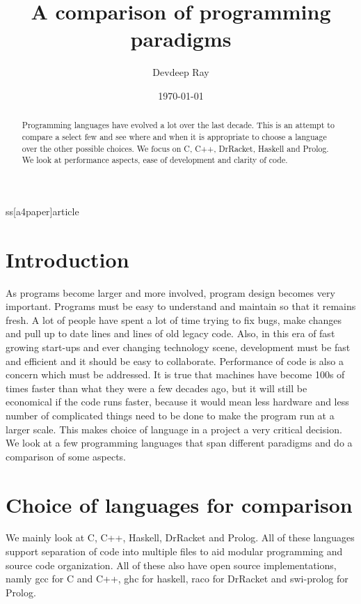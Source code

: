 ss[a4paper]{article}
\usepackage[a4paper, total={7in, 10in}]{geometry}
\usepackage[english]{babel}
\usepackage[utf8]{inputenc}
\usepackage{amsmath}
\usepackage{graphicx}
\usepackage{listings}

\title{A comparison of programming paradigms}

\author{Devdeep Ray}

\date{\today}


\maketitle

\begin{abstract}
Programming languages have evolved a lot over the last decade. This is an attempt 
to compare a select few and see where and when it is appropriate to choose a
language over the other possible choices. We focus on C, C++, DrRacket, Haskell 
and Prolog. We look at performance aspects, ease of development and clarity of 
code.
\end{abstract}

\section{Introduction}
As programs become larger and more involved, program design becomes very important.
Programs must be easy to understand and maintain so that it remains fresh. A lot of
people have spent a lot of time trying to fix bugs, make changes and pull up to
date lines and lines of old legacy code. Also, in this era of fast growing start-ups
and ever changing technology scene, development must be fast and efficient and it
should be easy to collaborate. Performance of code is also a concern which must be 
addressed. It is true that machines have become 100s of times faster than what they 
were a few decades ago, but it will still be economical if the code runs faster, 
because it would mean less hardware and less number of complicated things need 
to be done to make the program run at a larger scale. This makes choice of language
in a project a very critical decision. We look at a few programming languages that
span different paradigms and do a comparison of some aspects.

\section{Choice of languages for comparison}
We mainly look at C, C++, Haskell, DrRacket and Prolog. All of these languages support
separation of code into multiple files to aid modular programming and source code 
organization. All of these also have open source implementations, namly gcc for 
C and C++, ghc for haskell, raco for DrRacket and swi-prolog for Prolog.

